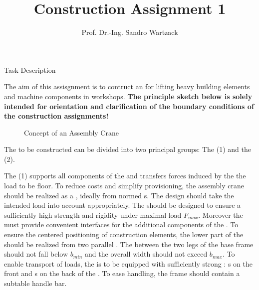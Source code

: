 \documentclass[a4paper]{omdoc}
\title{Construction Assignment 1}
\author{Prof. Dr.-Ing. Sandro Wartzack}
\begin{document}
\maketitle
{}
\begin{omgroup}{Task Description}
\begin{omtext}
  The aim of this assisgnment is to contruct an  for lifting
  heavy building elements and machine components in workshops. \textbf{The principle
    sketch below is solely intended for orientation and clarification of the boundary
    conditions of the construction assignments!}
\end{omtext}

\begin{figure}[ht]
\caption{Concept of an Assembly Crane}\label{fig:principle-solution-crane}
\end{figure}

\begin{omtext}
  The  to be constructed can be divided into two principal
  groups: The  (1) and the 
  (2).
\end{omtext}


\begin{omtext}
  The  (1) supports all components of the
   and transfers forces induced by the the load to be
  floor. To reduce costs and simplify provisioning, the assembly crane should be realized
  as a , ideally from normed
  s. The design should take the intended load into account
  appropriately. The  should be designed to ensure a
  sufficiently high strength and rigidity under maximal load $F_{max}$. Moreover the
   must provide convenient interfaces for the additional
  components of the . To ensure the centered positioning of
  construction elements, the lower part of the  should be
  realized from two parallel . The  between the
  two legs of the base frame should not fall below $b_{min}$ and the overall width should
  not exceed $b_{max}$. To enable transport of loads, the  is to
  be equipped with sufficiently strong :
  s on the front and s on the
  back of the . To ease handling, the frame should contain a
  subtable handle bar.
\end{omtext}


\end{omgroup}
\end{document}
